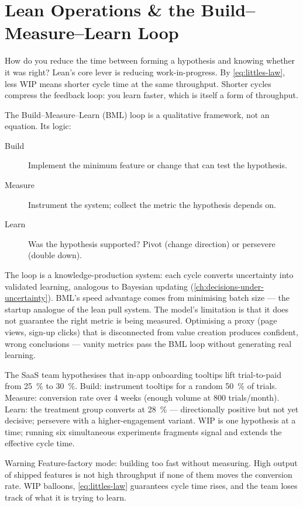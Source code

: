 \section{Lean Operations \& the Build--Measure--Learn Loop}\label{sec:lean-bml}

How do you reduce the time between forming a hypothesis and knowing whether it was right? Lean's core lever is reducing work-in-progress. By \cref{eq:littles-law}, less WIP means shorter cycle time at the same throughput. Shorter cycles compress the feedback loop: you learn faster, which is itself a form of throughput.

The Build--Measure--Learn (BML) loop is a qualitative framework, not an equation. Its logic:
\begin{description}
  \item[Build] Implement the minimum feature or change that can test the hypothesis.
  \item[Measure] Instrument the system; collect the metric the hypothesis depends on.
  \item[Learn] Was the hypothesis supported? Pivot (change direction) or persevere (double down).
\end{description}
The loop is a knowledge-production system: each cycle converts uncertainty into validated learning, analogous to Bayesian updating (\cref{ch:decisions-under-uncertainty}). BML's speed advantage comes from minimising batch size --- the startup analogue of the lean pull system. The model's limitation is that it does not guarantee the right metric is being measured. Optimising a proxy (page views, sign-up clicks) that is disconnected from value creation produces confident, wrong conclusions --- vanity metrics pass the BML loop without generating real learning.

\begin{example}
The SaaS team hypothesises that in-app onboarding tooltips lift trial-to-paid from \qty{25}{\percent} to \qty{30}{\percent}. Build: instrument tooltips for a random \qty{50}{\percent} of trials. Measure: conversion rate over 4 weeks (enough volume at \num{800} trials/month). Learn: the treatment group converts at \qty{28}{\percent} --- directionally positive but not yet decisive; persevere with a higher-engagement variant. WIP is one hypothesis at a time; running six simultaneous experiments fragments signal and extends the effective cycle time.
\end{example}

\begin{admonition}{Warning}
Feature-factory mode: building too fast without measuring. High output of shipped features is not high throughput if none of them moves the conversion rate. WIP balloons, \cref{eq:littles-law} guarantees cycle time rises, and the team loses track of what it is trying to learn.
\end{admonition}

